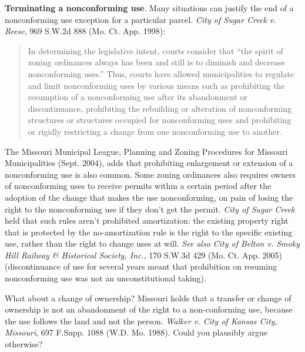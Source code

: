 \item
\textbf{Terminating a nonconforming use}. Many situations can justify the end of
a nonconforming use exception for a particular parcel. \emph{City of Sugar Creek
v. Reese}, 969 S.W.2d 888 (Mo. Ct. App. 1998):
\begin{quote}
In determining the legislative intent, courts consider that ``the spirit of
zoning ordinances always has been and still is to diminish and decrease
nonconforming uses.'' Thus, courts have allowed municipalities to regulate and
limit nonconforming uses by various means such as prohibiting the resumption of
a nonconforming use after its abandonment or discontinuance, prohibiting the
rebuilding or alteration of nonconforming structures or structures occupied for
nonconforming uses and prohibiting or rigidly restricting a change from one
nonconforming use to another. 
\end{quote}
The Missouri Municipal League, Planning and Zoning Procedures for Missouri
Municipalities (Sept. 2004), adds that prohibiting enlargement or extension of a
nonconforming use is also common. Some zoning ordinances also requires owners of
nonconforming uses to receive permits within a certain period after the adoption
of the change that makes the use nonconforming, on pain of losing the right to
the nonconforming use if they don't get the permit. \textit{City of Sugar Creek}
held that such rules aren't prohibited amortization: the existing property right
that is protected by the no-amortization rule is the right to the specific
existing use, rather than the right to change uses at will. \textit{See also}
\emph{City of Belton v. Smoky Hill Railway \& Historical Society, Inc.}, 170
S.W.3d 429 (Mo. Ct. App. 2005) (discontinuance of use for several years meant
that prohibition on resuming nonconforming use was not an unconstitutional
taking).

\item
What about a change of ownership? Missouri holds that a transfer or change of
ownership is not an abandonment of the right to a non-conforming use, because
the use follows the land and not the person. \emph{Walker v. City of Kansas
City, Missouri}, 697 F.Supp. 1088 (W.D. Mo. 1988). Could you plausibly argue
otherwise?

